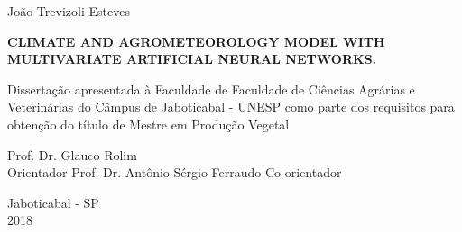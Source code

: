 \clearpage

\thispagestyle{empty}

\centerline{{\normalsize{João Trevizoli Esteves}}}

\vspace*{4.5cm}


\begin{center}
\Large\textrm{\textbf{
CLIMATE AND AGROMETEOROLOGY MODEL WITH MULTIVARIATE ARTIFICIAL NEURAL NETWORKS.}} %
\end{center}
\vspace*{5cm}

\hspace*{7.3cm} 
\begin{minipage}[b]{0.45\linewidth}
  \begin{espacosimples}
    Dissertação apresentada à Faculdade de Faculdade de Ciências Agrárias e Veterinárias do Câmpus de Jaboticabal - UNESP como parte dos requisitos para obtenção do título de Mestre em Produção Vegetal 
  \end{espacosimples}
\end{minipage}


\vspace*{0.5cm}

\begin{flushleft}
\begin{espacosimples}
\normalsize
\hspace*{8.0cm} Prof. Dr. Glauco Rolim \\[0.5ex]
\hspace*{8.0cm} Orientador
\hspace*{8.0cm} Prof. Dr. Antônio Sérgio Ferraudo
\hspace*{8.0cm} Co-orientador
\end{espacosimples}
\end{flushleft}


\vspace*{2.0cm}
\begin{center}
Jaboticabal - SP\\ 2018
\end{center}

